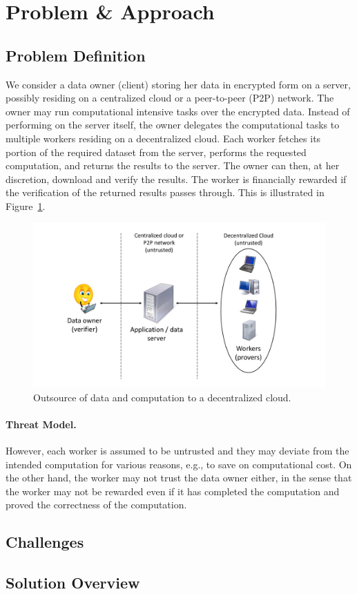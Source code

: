 \section{Problem \& Approach} \label{sect:overview}

\subsection{Problem Definition} \label{sect:problem}

We consider a data owner (client) storing her data in encrypted form on a server, possibly residing on a centralized cloud or a peer-to-peer (P2P) network.
The owner may run computational intensive tasks over the encrypted data.
Instead of performing on the server itself, the owner delegates the computational tasks to multiple workers residing on a decentralized cloud. 
Each worker fetches its portion of the required dataset from the server, performs the requested computation, and returns the results to the server.
The owner can then, at her discretion, download and verify the results.
The worker is financially rewarded if the verification of the returned results passes through.
This is illustrated in Figure~\ref{fig:model}.

\begin{figure}[h!]\centering
  \includegraphics[scale=0.30]{model.pdf}
  \caption{Outsource of data and computation to a decentralized cloud.}
  \label{fig:model}
\end{figure}

\paragraph{Threat Model.}
However, each worker is assumed to be untrusted and they may deviate from the intended computation for various reasons, e.g., to save on computational cost. 
On the other hand, the worker may not trust the data owner either, in the sense that the worker may not be rewarded even if it has completed the computation and proved the correctness of the computation.


\subsection{Challenges} \label{sect:challenges}

\subsection{Solution Overview} \label{sect:solution}